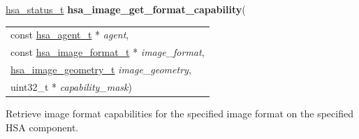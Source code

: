 \documentclass[final]{book}
\newcommand{\hsaarg}[1]{\textit{#1}}
\begin{document}
\begin{appendices}
\noindent\begin{tcolorbox}[breakable,nobeforeafter,colframe=white,colback=lightgray,left=0mm]
\hyperlink{group--status-1gad755322e7ff95456520e8abdbe90d225}{hsa_status_t} \hypertarget{group--images-1ga48e525e1be37d9ac4e4f6f6a422b3b11}{\textbf{hsa_image_get_format_capability}}(
\vspace{-3.5mm}\begin{longtable}{@{}p{\textwidth}}
\hspace{1.7em}const \hyperlink{group--topology-1gab8db3fb886332a24acac08ec361e1d86}{hsa_agent_t} * \hsaarg{agent},\\
\hspace{1.7em}const \hyperlink{group--images-1ga392dce390c0a83c2553fd99669888c94}{hsa_image_format_t} * \hsaarg{image_format},\\
\hspace{1.7em}\hyperlink{group--images-1ga31e40ddc0666f01a0821a9bc37ca514b}{hsa_image_geometry_t} \hsaarg{image_geometry},\\
\hspace{1.7em}uint32_t * \hsaarg{capability_mask})\end{longtable}

\end{tcolorbox}
Retrieve image format capabilities for the specified image format on the specified HSA component.


\end{appendices}
\end{document}
